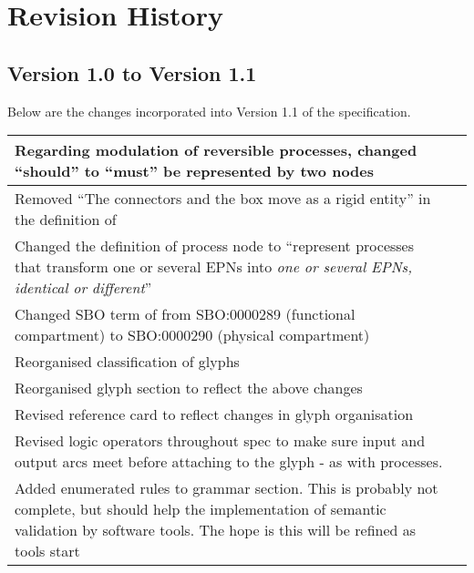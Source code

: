 \chapter{Revision History}

\section{Version 1.0 to Version 1.1}

Below are the changes incorporated into Version 1.1 of the \SBGNPDLone specification.

\begin{center}
\label{tab:revision history 1.1}
\tablelasttail{\hline}
\begin{supertabular}{|p{12cm}|c|}\hline
Regarding modulation of reversible processes, changed ``should'' to ``must'' be represented by two  nodes & \\\hline
Removed ``The connectors and the box move as a rigid entity'' in the definition of  & \\\hline
Changed the definition of process node to ``represent processes that transform one or several EPNs into \emph{one or several EPNs, identical or different}''& \\\hline
Changed SBO term of  from SBO:0000289 (functional compartment) to SBO:0000290 (physical compartment) & \\\hline
Reorganised classification of glyphs & \\\hline
Reorganised glyph section to reflect the above changes & \\\hline
Revised reference card to reflect changes in glyph organisation &
\\\hline
Revised logic operators throughout spec to make sure input and output
arcs meet before attaching to the glyph - as with processes. &
\\\hline
Added enumerated rules to grammar section. This is probably not
complete, but should help the implementation of semantic validation by
software tools. The hope is this will be refined as tools start

\end{supertabular}
\end{center}
